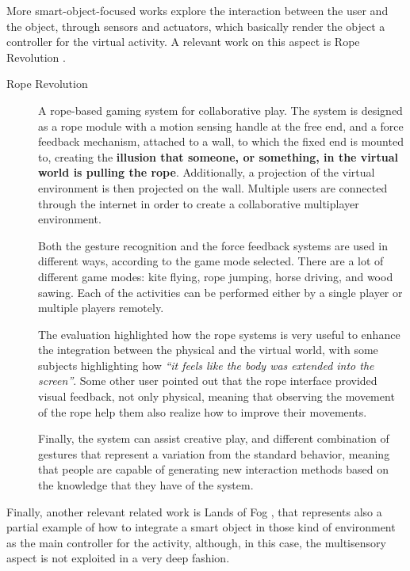 \noindent More smart-object-focused works explore the interaction between the user and the object, through sensors and actuators, which basically render the object a controller for the virtual activity. A relevant work on this aspect is Rope Revolution \cite{yao_rope_2011}.

\begin{description}
	\item[Rope Revolution]  A rope-based gaming system for collaborative play.
	The system is designed as a rope module with a motion sensing handle at the free end, and a force feedback mechanism, attached to a wall, to which the fixed end is mounted to, creating the \textbf{illusion that someone, or something, in the virtual world is pulling the rope}.
	Additionally, a projection of the virtual environment is then projected on the wall. Multiple users are connected through the internet in order to create a collaborative multiplayer environment.
	
	Both the gesture recognition and the force feedback systems are used in different ways, according to the game mode selected.
	There are a lot of different game modes: kite flying, rope jumping, horse driving, and wood sawing. Each of the activities can be performed either by a single player or multiple players remotely.
	
	The evaluation highlighted how the rope systems is very useful to enhance the integration between the physical and the virtual world, with some subjects highlighting how \textit{``it feels like the body was extended into the screen''}.
	Some other user pointed out that the rope interface provided visual feedback, not only physical, meaning that observing the movement of the rope help them also realize how to improve their movements.
	
	Finally, the system can assist creative play, and different combination of gestures that represent a variation from the standard behavior,  meaning that people are capable of generating new interaction methods based on the knowledge that they have of the system.
\end{description}

\noindent Finally, another relevant related work is Lands of Fog \cite{mora-guiard_lands_2016}, that represents also a partial example of how to integrate a smart object in those kind of environment as the main controller for the activity, although, in this case, the multisensory aspect is not exploited in a very deep fashion.

